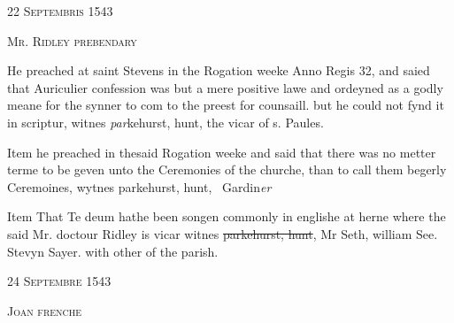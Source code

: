 \documentclass[12pt, a4paper]{book}
\begin{document}
               
				\begin{center} \begin{large} {\scshape 
                  22 Septembris 1543
               } \end{large} \end{center}
			
               
               	
				\begin{center}  {\scshape Mr. Ridley prebendary}  \end{center}
			

               	
				\marginpar[\vspace{0.5cm}{\textcolor{Gray}{confession}}]{}
			
		\ifthenelse{\isodd{\thepage}}
		{\reversemarginpar}
		{\normalmarginpar}
		He preached at saint Stevens in the Rogation weeke
 Anno Regis 32, and saied that Auriculier confession
 was but a mere positive lawe and ordeyned as
 a godly meane for the synner to com to the preest
 for counsaill. but he could not fynd it in scriptur,
 witnes \textit{par}kehurst, hunt, the vicar of s. Paules.
               	
				\marginpar[\vspace{0.5cm}{\textcolor{Gray}{ceremonies}}]{}
			
		\ifthenelse{\isodd{\thepage}}
		{\reversemarginpar}
		{\normalmarginpar}
		Item he preached in thesaid Rogation weeke and said
 that there was no metter terme to be geven unto
 the Ceremonies of the churche, than to call them
 begerly Ceremoines, wytnes parkehurst, hunt, 
 Gardin\textit{er}
 
		\ifthenelse{\isodd{\thepage}}
		{\reversemarginpar}
		{\normalmarginpar}
		Item That Te deum hathe been songen commonly
 	in englishe at herne where the said Mr. doctour
 Ridley is vicar
 witnes \sout{parkehurst, hunt}, Mr Seth, william See. Stevyn
 Sayer. with other of the parish.
 

            
            
               
				\begin{center} \begin{large} {\scshape 
                  24 Septembre 1543
               } \end{large} \end{center}
			
               
                  
				\begin{center}  {\scshape Joan frenche}  \end{center}
			
\end{document}
